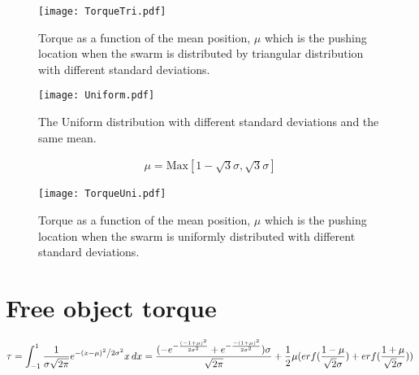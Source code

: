 \begin{figure}
\begin{center}
	\texttt{[image: TorqueTri.pdf]}
\end{center}
\vspace{-1em}
\caption{\label{fig:torqueTri}
Torque as a function of the mean position, $\mu$ which is the pushing location when the swarm is distributed by triangular distribution with different standard deviations.
}
\vspace{2em}
\end{figure}


\newpage
\begin{figure}
\begin{center}
	\texttt{[image: Uniform.pdf]}
\end{center}
\caption{\label{fig:pdfUni}
The Uniform distribution with different standard deviations and the same mean.
}
\vspace{-1em}
\end{figure}
\begin{align}
\mu = \textrm{Max}[1-\sqrt{3}\sigma,\sqrt{3}\sigma]
\end{align}
\begin{figure}
\begin{center}
	\texttt{[image: TorqueUni.pdf]}
\end{center}
\vspace{-1em}
\caption{\label{fig:torqueUni}
Torque as a function of the mean position, $\mu$ which is the pushing location when the swarm is uniformly distributed with different standard deviations.
}
\vspace{-1em}
\end{figure}


\newpage

\section{Free object torque}

\begin{strip}
\begin{align} \nonumber
\tau = \int_{-1}^1\frac{1}{{\sigma \sqrt {2\pi } }}e^{{{ - \left( {x - \mu } \right)^2 } \mathord{\left/ {\vphantom {{ - \left( {x - \mu } \right)^2 } {2\sigma ^2 }}} \right. \kern-\nulldelimiterspace} {2\sigma ^2 }}} x \, dx = \frac{(-e^{-\frac{(-1+\mu)^2}{2\sigma^2}}+e^{-\frac{-(1+\mu)^2}{2\sigma^2}})\sigma}{\sqrt{2\pi}}+ \frac{1}{2}\mu(erf(\frac{1-\mu}{\sqrt{2}\sigma})+erf(\frac{1+\mu}{\sqrt{2}\sigma})) 
\end{align}
\end{strip}


